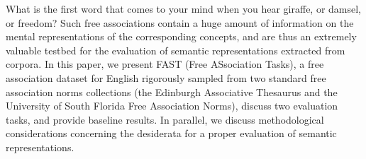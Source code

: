 What is the first word that comes to your mind when you hear giraffe, or damsel, or freedom? Such free associations contain a huge amount of information on the mental representations of the corresponding concepts, and are thus an extremely valuable testbed for the evaluation of semantic representations extracted from corpora. In this paper, we present FAST (Free ASsociation Tasks), a free association dataset for English rigorously sampled from two standard free association norms collections (the Edinburgh Associative Thesaurus and the University of South Florida Free Association Norms), discuss two evaluation tasks, and provide baseline results. In parallel, we discuss methodological considerations concerning the desiderata for a proper evaluation of semantic representations.
